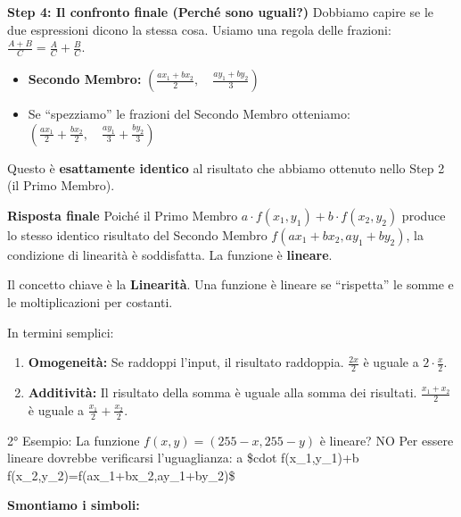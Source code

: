 \documentclass[
]{article}
\providecommand{\tightlist}{%
  \setlength{\itemsep}{0pt}\setlength{\parskip}{0pt}}
\begin{document}
\textbf{Step 4: Il confronto finale (Perché sono uguali?)}
Dobbiamo capire se le due espressioni dicono la stessa cosa. Usiamo una regola delle frazioni: \(\frac{A+B}{C} = \frac{A}{C} + \frac{B}{C}\).

\begin{itemize}
\tightlist
\item
  \textbf{Secondo Membro:} \((\frac{a x_1 + b x_2}{2}, \quad \frac{a y_1 + b y_2}{3})\)
\item
  Se ``spezziamo'' le frazioni del Secondo Membro otteniamo:
  \((\frac{a x_1}{2} + \frac{b x_2}{2}, \quad \frac{a y_1}{3} + \frac{b y_2}{3})\)
\end{itemize}

Questo è \textbf{esattamente identico} al risultato che abbiamo ottenuto nello Step 2 (il Primo Membro).

\textbf{Risposta finale}
Poiché il Primo Membro \(a \cdot f(x_1, y_1) + b \cdot f(x_2, y_2)\) produce lo stesso identico risultato del Secondo Membro \(f(ax_1+bx_2, ay_1+by_2)\), la condizione di linearità è soddisfatta. La funzione è \textbf{lineare}.

Il concetto chiave è la \textbf{Linearità}. Una funzione è lineare se ``rispetta'' le somme e le moltiplicazioni per costanti.

In termini semplici:

\begin{enumerate}
\def\labelenumi{\arabic{enumi}.}
\tightlist
\item
  \textbf{Omogeneità:} Se raddoppi l'input, il risultato raddoppia. \(\frac{2x}{2}\) è uguale a \(2 \cdot \frac{x}{2}\).
\item
  \textbf{Additività:} Il risultato della somma è uguale alla somma dei risultati. \(\frac{x_1+x_2}{2}\) è uguale a \(\frac{x_1}{2} + \frac{x_2}{2}\).
\end{enumerate}

2° Esempio: La funzione \(f(x,y)=(255-x,255-y)\) è lineare? NO
Per essere lineare dovrebbe verificarsi l'uguaglianza:
a \$cdot f(x\_1,y\_1)+b \cdot f(x\_2,y\_2)=f(ax\_1+bx\_2,ay\_1+by\_2)\$

\textbf{Smontiamo i simboli:}
\end{document}
